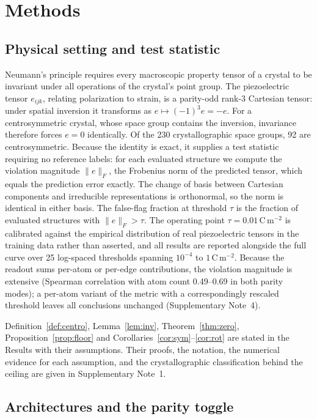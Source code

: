 \section*{Methods}

\subsection*{Physical setting and test statistic}

Neumann's principle requires every macroscopic property tensor of a crystal to be invariant under all operations of the crystal's point group. The piezoelectric tensor $e_{ijk}$, relating polarization to strain, is a parity-odd rank-3 Cartesian tensor: under spatial inversion it transforms as $e \mapsto (-1)^{3} e = -e$. For a centrosymmetric crystal, whose space group contains the inversion, invariance therefore forces $e = 0$ identically. Of the 230 crystallographic space groups, 92 are centrosymmetric. Because the identity is exact, it supplies a test statistic requiring no reference labels: for each evaluated structure we compute the violation magnitude $\lVert e \rVert_F$, the Frobenius norm of the predicted tensor, which equals the prediction error exactly. The change of basis between Cartesian components and irreducible representations is orthonormal, so the norm is identical in either basis. The false-flag fraction at threshold $\tau$ is the fraction of evaluated structures with $\lVert e \rVert_F > \tau$. The operating point $\tau = 0.01$\,C\,m$^{-2}$ is calibrated against the empirical distribution of real piezoelectric tensors in the training data rather than asserted, and all results are reported alongside the full curve over 25 log-spaced thresholds spanning $10^{-4}$ to $1$\,C\,m$^{-2}$. Because the readout sums per-atom or per-edge contributions, the violation magnitude is extensive (Spearman correlation with atom count 0.49--0.69 in both parity modes); a per-atom variant of the metric with a correspondingly rescaled threshold leaves all conclusions unchanged (Supplementary Note~4).

Definition~\ref{def:centro}, Lemma~\ref{lem:inv}, Theorem~\ref{thm:zero}, Proposition~\ref{prop:floor} and Corollaries~\ref{cor:sym}--\ref{cor:rot} are stated in the Results with their assumptions. Their proofs, the notation, the numerical evidence for each assumption, and the crystallographic classification behind the ceiling are given in Supplementary Note~1.

\subsection*{Architectures and the parity toggle}

